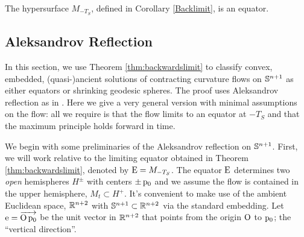 \documentclass{amsart}
\begin{document}
\begin{theorem}
\label{thm:backwardslimit}
The hypersurface $M_{-T_S}$, defined in Corollary \ref{Backlimit}, is an equator.
\end{theorem}
\subsection{Aleksandrov Reflection}
In this section, we use Theorem \ref{thm:backwardslimit} to classify convex, embedded, (quasi-)ancient solutions of contracting curvature flows on \(\S^{n+1}\) as either equators or shrinking geodesic spheres. The proof uses Aleksandrov reflection as in \cite{bryanlouie,2015arXiv150802821B}. Here we give a very general version with minimal assumptions on the flow: all we require is that the flow limits to an equator at $-T_S$ and that the maximum principle holds forward in time.

We begin with some preliminaries of the Aleksandrov reflection on \(\S^{n+1}\). First, we will work relative to the limiting equator obtained in Theorem \ref{thm:backwardslimit}, denoted by $\equator = M_{-T_S}$. The equator \(\equator\) determines two \emph{open} hemispheres \(H^{\pm}\) with centers \(\pm \basepoint\) and we assume the flow is contained in the upper hemisphere, $M_t \subset H^+$. It's convenient to make use of the ambient Euclidean space, \(\R^{n+2}\) with \(\S^{n+1} \subset \R^{n+2}\) via the standard embedding. Let \(\vertvec = \overrightarrow{\origin\basepoint}\) be the unit vector in \(\R^{n+2}\) that points from the origin \(\origin\) to \(\basepoint\); the ``vertical direction''. 
\end{document}

